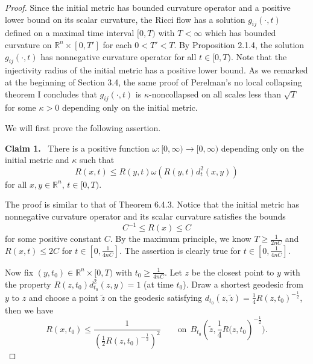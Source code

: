 \begin{proof}
Since the initial metric has bounded curvature operator and a
positive lower bound on its scalar curvature, the Ricci flow has a
solution $g_{ij}(\cdot,t)$ defined on a maximal time interval
$[0,T)$ with $T<\infty$ which has bounded curvature on
$\mathbb{R}^n \times [0,T']$ for each $0<T'<T$. By Proposition
2.1.4, the solution $g_{ij}(\cdot,t)$ has nonnegative curvature
operator for all $t \in [0, T)$.  Note that the injectivity radius
of the initial metric has a positive lower bound. As we remarked
at the beginning of Section 3.4, the same proof of Perelman's no
local collapsing theorem I concludes that $g_{ij}({\cdot,t})$ is
$\kappa$-noncollapsed on all scales less than $\sqrt{T}$ for some
$\kappa>0$ depending only on the initial metric.

We will first prove the following assertion.

\medskip
{\bf Claim 1.} \ There is a positive function
$\omega:[0,\infty)\rightarrow[0,\infty)$ depending only on the
initial metric and $\kappa$ such that
$$
  R(x,t)\leq R(y,t)\omega(R(y,t)d_{t}^{2}(x,y))
$$
for all $x,y\in \mathbb{R}^{n}$, $t\in[0,T)$.

\medskip
The proof is similar to that of Theorem 6.4.3. Notice that the
initial metric has nonnegative curvature operator and its scalar
curvature satisfies the bounds \begin{equation}
C^{-1}\leqslant R(x)\leqslant C %
\end{equation} for some positive constant $C$. By the maximum principle, we
know $T\geq\frac{1}{2nC}$ and $R(x,t)\leq 2C$ for
$t\in[0,\frac{1}{4nC}]$. The assertion is clearly true for
$t\in[0,\frac{1}{4nC}]$.

Now fix $(y,t_{0})\in \mathbb{R}^{n}\times[0,T)$ with
$t_{0}\geq\frac{1}{4nC}$. Let $z$ be the closest point to $y$ with
the property $R(z,t_{0})d^{2}_{t_{0}}(z,y)=1$ (at time $t_{0}$).
Draw a shortest geodesic from $y$ to $z$ and choose a point
$\tilde{z}$ on the geodesic satisfying $d_{t_{0}}(z,\tilde{z})
=\frac{1}{4}R(z,t_{0})^{-\frac{1}{2}}$, then we have
$$
 R(x,t_{0})\leq\frac{1}{(\frac{1}{2}R(z,t_{0})^{-\frac{1}{2}})^{2}}
    \qquad \mbox{on}\ \
 B_{t_{0}}\left(\tilde{z},\frac{1}{4}R(z,t_{0}\right)^{-\frac{1}{2}}).
$$


\end{proof}
